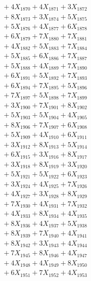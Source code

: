 \documentclass[a4paper,10pt]{article}
\begin{document}
{\begin{align}
&\;  + 4 X_{1870} + 4 X_{1871} + 3 X_{1872} \\[0.3ex]
&\;  + 8 X_{1873} + 3 X_{1874} + 5 X_{1875} \\[0.3ex]
&\;  + 5 X_{1876} + 4 X_{1877} + 6 X_{1878} \\[0.3ex]
&\;  + 6 X_{1879} + 7 X_{1880} + 7 X_{1881} \\[0.3ex]
&\;  + 4 X_{1882} + 5 X_{1883} + 7 X_{1884} \\[0.3ex]
&\;  + 5 X_{1885} + 6 X_{1886} + 7 X_{1887} \\[0.3ex]
&\;  + 5 X_{1888} + 4 X_{1889} + 7 X_{1890} \\[0.3ex]
&\;  + 6 X_{1891} + 5 X_{1892} + 7 X_{1893} \\[0.3ex]
&\;  + 6 X_{1894} + 7 X_{1895} + 5 X_{1896} \\[0.3ex]
&\;  + 7 X_{1897} + 5 X_{1898} + 7 X_{1899} \\[0.5ex]\allowbreak
&\;  + 3 X_{1900} + 7 X_{1901} + 8 X_{1902} \\[0.3ex]
&\;  + 5 X_{1903} + 5 X_{1904} + 4 X_{1905} \\[0.3ex]
&\;  + 8 X_{1906} + 7 X_{1907} + 6 X_{1908} \\[0.3ex]
&\;  + 5 X_{1909} + 4 X_{1910} + 6 X_{1911} \\[0.3ex]
&\;  + 3 X_{1912} + 8 X_{1913} + 5 X_{1914} \\[0.3ex]
&\;  + 6 X_{1915} + 3 X_{1916} + 8 X_{1917} \\[0.3ex]
&\;  + 3 X_{1918} + 8 X_{1919} + 3 X_{1920} \\[0.3ex]
&\;  + 5 X_{1921} + 5 X_{1922} + 6 X_{1923} \\[0.3ex]
&\;  + 3 X_{1924} + 4 X_{1925} + 7 X_{1926} \\[0.3ex]
&\;  + 4 X_{1927} + 3 X_{1928} + 8 X_{1929} \\[0.5ex]\allowbreak
&\;  + 7 X_{1930} + 4 X_{1931} + 7 X_{1932} \\[0.3ex]
&\;  + 4 X_{1933} + 8 X_{1934} + 4 X_{1935} \\[0.3ex]
&\;  + 8 X_{1936} + 4 X_{1937} + 5 X_{1938} \\[0.3ex]
&\;  + 8 X_{1939} + 7 X_{1940} + 4 X_{1941} \\[0.3ex]
&\;  + 8 X_{1942} + 3 X_{1943} + 4 X_{1944} \\[0.3ex]
&\;  + 7 X_{1945} + 8 X_{1946} + 4 X_{1947} \\[0.3ex]
&\;  + 4 X_{1948} + 4 X_{1949} + 8 X_{1950} \\[0.3ex]
&\;  + 6 X_{1951} + 7 X_{1952} + 4 X_{1953} \\[0.3ex]

\end{align}}
\end{document}
